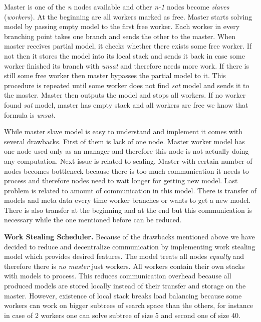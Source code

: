 \documentclass[letterpaper]{article}
\newcommand{\mypar}[1]{{\bf #1.}}
\begin{document}
Master is one of the \textit{n} nodes available and other \textit{n-1} nodes become \textit{slaves} (\textit{workers}). At the beginning are all workers marked as free. Master starts solving model by passing empty model to the first free worker. Each worker in every branching point takes one branch and sends the other to the master. When master receives partial model, it checks whether there exists some free worker. If not then it stores the model into its local stack and sends it back in case some worker finished its branch with \textit{unsat} and therefore needs more work. If there is still some free worker then master bypasses the partial model to it. This procedure is repeated until some worker does not find \textit{sat} model and sends it to the master. Master then outputs the model and stops all workers. If no worker found \textit{sat} model, master has empty stack and all workers are free we know that formula is \textit{unsat}.

While master slave model is easy to understand and implement it comes with several drawbacks. First of them is lack of one node. Master worker model has one node used only as an manager and therefore this node is not actually doing any computation. Next issue is related to scaling. Master with certain number of nodes becomes bottleneck because there is too much communication it needs to process and therefore nodes need to wait longer for getting new model. Last problem is related to amount of communication in this model. There is transfer of models and meta data every time worker branches or wants to get a new model. There is also transfer at the beginning and at the end but this communication is necessary while the one mentioned before can be reduced.  

\mypar{Work Stealing Scheduler} Because of the drawbacks mentioned above we have decided to reduce and decentralize communication by implementing work stealing model which provides desired features. The model treats all nodes \textit{equally} and therefore there is \textit{no master} just workers. All workers contain their own stacks with models to process. This reduces communication overhead because all produced models are stored locally instead of their transfer and storage on the master. However, existence of local stack breaks load balancing because some workers can work on bigger subtrees of search space than the others, for instance in case of 2 workers one can solve subtree of size 5 and second one of size 40. 
\end{document}
